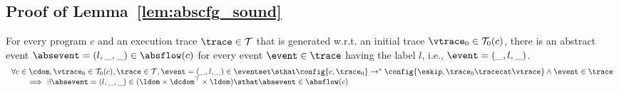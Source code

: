 
\subsection{Proof of Lemma~\ref{lem:abscfg_sound}}
\label{apdx:abscfg_sound}
\begin{lemma}
  For every program $c$ and
  an execution trace $\trace \in \mathcal{T}$ that is generated w.r.t.
  an initial trace  $\vtrace_0 \in \mathcal{T}_0(c)$,
  there is an abstract event $\absevent = (l, \_, \_) \in \absflow(c)$ 
  for every event $\event \in \trace$ having the label $l$, i.e., $\event = (\_, l, \_)$.
\[
  \begin{array}{l}
    \forall c \in \cdom, \vtrace_0 \in \mathcal{T}_0(c), \trace \in \mathcal{T} ,  \event = (\_, l, \_) \in \eventset \sthat 
\config{{c}, \trace_0} \to^{*} \config{\eskip, \trace_0 \tracecat \vtrace} 
\land \event \in \trace 
\\
\qquad \implies \exists \absevent = (l, \_, \_) \in (\ldom\times \dcdom^{\top} \times \ldom) \sthat  
\absevent \in \absflow(c)
\end{array}
\]
\end{lemma}


